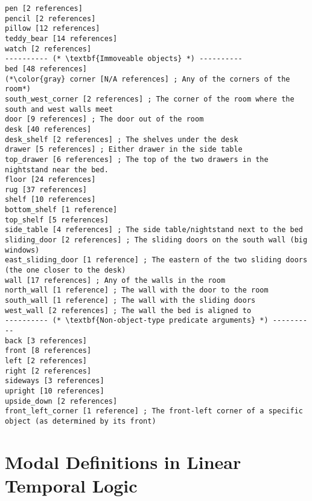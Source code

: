 \documentclass{article}
\begin{document}
\begin{lstlisting}
pen [2 references]
pencil [2 references]
pillow [12 references]
teddy_bear [14 references]
watch [2 references]
---------- (* \textbf{Immoveable objects} *) ----------
bed [48 references]
(*\color{gray} corner [N/A references] ; Any of the corners of the room*)
south_west_corner [2 references] ; The corner of the room where the south and west walls meet
door [9 references] ; The door out of the room
desk [40 references]
desk_shelf [2 references] ; The shelves under the desk
drawer [5 references] ; Either drawer in the side table
top_drawer [6 references] ; The top of the two drawers in the nightstand near the bed.
floor [24 references]
rug [37 references]
shelf [10 references]
bottom_shelf [1 reference]
top_shelf [5 references]
side_table [4 references] ; The side table/nightstand next to the bed
sliding_door [2 references] ; The sliding doors on the south wall (big windows)
east_sliding_door [1 reference] ; The eastern of the two sliding doors (the one closer to the desk)
wall [17 references] ; Any of the walls in the room
north_wall [1 reference] ; The wall with the door to the room
south_wall [1 reference] ; The wall with the sliding doors
west_wall [2 references] ; The wall the bed is aligned to
---------- (* \textbf{Non-object-type predicate arguments} *) ----------
back [3 references]
front [8 references]
left [2 references]
right [2 references]
sideways [3 references]
upright [10 references]
upside_down [2 references]
front_left_corner [1 reference] ; The front-left corner of a specific object (as determined by its front)
\end{lstlisting}




\section{Modal Definitions in Linear Temporal Logic}
\end{document}
